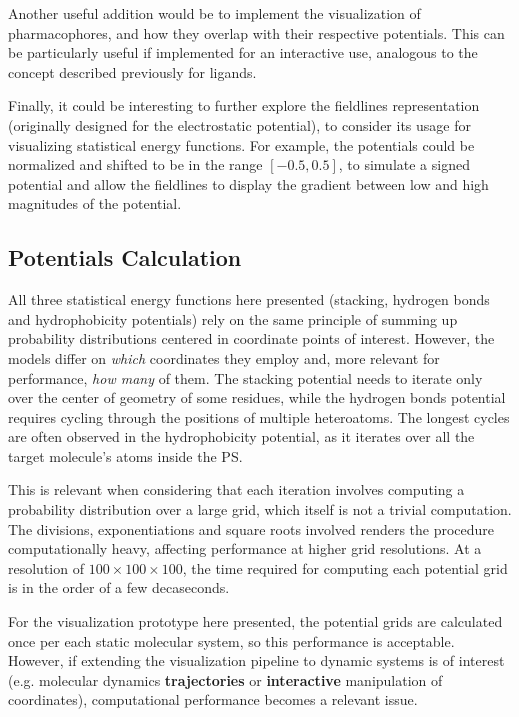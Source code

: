     Another useful addition would be to implement the visualization of pharmacophores, and how they overlap with their respective potentials. This can be particularly useful if implemented for an interactive use, analogous to the concept described previously for ligands.

    Finally, it could be interesting to further explore the fieldlines representation (originally designed for the electrostatic potential), to consider its usage for visualizing statistical energy functions. For example, the potentials could be normalized and shifted to be in the range $[-0.5, 0.5]$, to simulate a signed potential and allow the fieldlines to display the gradient between low and high magnitudes of the potential.

  \subsection{Potentials Calculation}
    All three statistical energy functions here presented (stacking, hydrogen bonds and hydrophobicity potentials) rely on the same principle of summing up probability distributions centered in coordinate points of interest. However, the models differ on \textit{which} coordinates they employ and, more relevant for performance, \textit{how many} of them. The stacking potential needs to iterate only over the center of geometry of some residues, while the hydrogen bonds potential requires cycling through the positions of multiple heteroatoms. The longest cycles are often observed in the hydrophobicity potential, as it iterates over all the target molecule's atoms inside the PS.

    This is relevant when considering that each iteration involves computing a probability distribution over a large grid, which itself is not a trivial computation. The divisions, exponentiations and square roots involved renders the procedure computationally heavy, affecting performance at higher grid resolutions. At a resolution of $100 \times 100 \times 100$, the time required for computing each potential grid is in the order of a few decaseconds.

    For the visualization prototype here presented, the potential grids are calculated once per each static molecular system, so this performance is acceptable. However, if extending the visualization pipeline to dynamic systems is of interest (e.g. molecular dynamics \textbf{trajectories} or \textbf{interactive} manipulation of coordinates), computational performance becomes a relevant issue.


